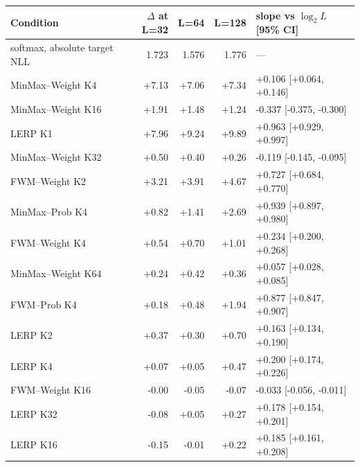 \begin{tabular}{lrrrl}
\toprule
Condition & $\Delta$ at L=32 & L=64 & L=128 & slope vs $\log_2 L$ [95\% CI] \\
\midrule
softmax, absolute target NLL & 1.723 & 1.576 & 1.776 & --- \\ \midrule
MinMax--Weight K4 & +7.13 & +7.06 & +7.34 & +0.106 [+0.064, +0.146] \\
MinMax--Weight K16 & +1.91 & +1.48 & +1.24 & -0.337 [-0.375, -0.300] \\
LERP K1 & +7.96 & +9.24 & +9.89 & +0.963 [+0.929, +0.997] \\
MinMax--Weight K32 & +0.50 & +0.40 & +0.26 & -0.119 [-0.145, -0.095] \\
FWM--Weight K2 & +3.21 & +3.91 & +4.67 & +0.727 [+0.684, +0.770] \\
MinMax--Prob K4 & +0.82 & +1.41 & +2.69 & +0.939 [+0.897, +0.980] \\
FWM--Weight K4 & +0.54 & +0.70 & +1.01 & +0.234 [+0.200, +0.268] \\
MinMax--Weight K64 & +0.24 & +0.42 & +0.36 & +0.057 [+0.028, +0.085] \\
FWM--Prob K4 & +0.18 & +0.48 & +1.94 & +0.877 [+0.847, +0.907] \\
LERP K2 & +0.37 & +0.30 & +0.70 & +0.163 [+0.134, +0.190] \\
LERP K4 & +0.07 & +0.05 & +0.47 & +0.200 [+0.174, +0.226] \\
FWM--Weight K16 & -0.00 & -0.05 & -0.07 & -0.033 [-0.056, -0.011] \\
LERP K32 & -0.08 & +0.05 & +0.27 & +0.178 [+0.154, +0.201] \\
LERP K16 & -0.15 & -0.01 & +0.22 & +0.185 [+0.161, +0.208] \\
\bottomrule
\end{tabular}
